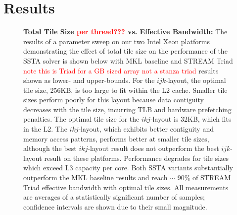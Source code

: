 \documentclass{sig-alternate-05-2015}
\newcommand{\fix}[1]{\textcolor{red}{#1}}
\begin{document}
\section{Results}
\label{sec:results}

\begin{figure}[!bth]
  \centering
  \caption{
    \textbf{Total Tile Size \fix{per thread???} vs. Effective Bandwidth:}
    The results of a parameter sweep on our two Intel Xeon platforms
      demonstrating the effect of total tile size on the performance of the
      SSTA solver is shown below with MKL baseline and STREAM Triad \fix{note this is Triad for a GB sized array not a stanza triad} results shown as
      lower- and upper-bounds.
    For the \(ijk\)-layout, the optimal tile size, 256KB, is too large to fit
      within the L2 cache.
    Smaller tile sizes perform poorly for this layout because data contiguity
      decreases with the tile size, incurring TLB and hardware prefetching
      penalties.
    The optimal tile size for the \(ikj\)-layout is 32KB, which fits in the L2. 
    The \(ikj\)-layout, which exhibits better contiguity and memory access
      patterns, performs better at smaller tile sizes, although the best
      \(ikj\)-layout result does not outperform the best \(ijk\)-layout result
      on these platforms.
    Performance degrades for tile sizes which exceed L3 capacity per core.
    Both SSTA variants substantially outperform the MKL baseline results and 
      reach \(\sim\) 90\% of STREAM Triad effective bandwidth with optimal 
      tile sizes.
    All measurements are averages of a statistically significant number of
      samples; confidence intervals are shown due to their small magnitude.
  }
  \label{fig:results:tile_size_xeon}
  \vspace{1em}
  \begin{minipage}{0.49\textwidth}
\end{minipage}
\end{figure}
\end{document}
